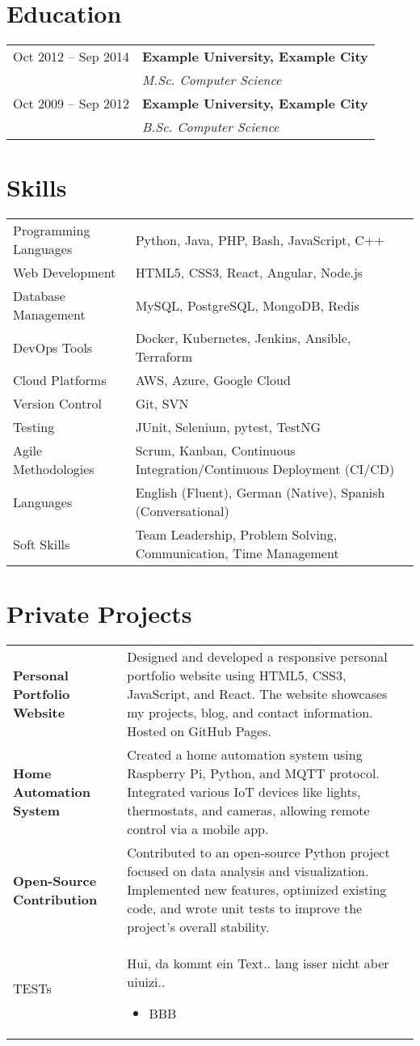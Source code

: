 \documentclass{scrartcl}
\newcommand{\leftcolsize}{4cm}
\newcommand{\educationitem}[3]{%
    #1 & \textbf{#2} \\
       & \textit{#3} \\
}
\newcommand{\cvblock}[2]{
    \section*{#1}
    \begin{tabularx}{\textwidth}[ht]{>{\raggedleft}p{\leftcolsize}|X}
    		#2
    \end{tabularx}
    \vspace{0.5em}   
}
\newcommand{\cvblockitem}[2]{
    #1 & #2 \\
}
\newcommand{\privateprojects}[1]{
    \section*{Private Projects}
    \begin{tabularx}{\textwidth}[ht]{>{\raggedleft}p{\leftcolsize}|X}
       #1
    \end{tabularx}
    \vspace{0.5em} %
    \ifthenelse{\isundefined{\github}}{}{\textbf{GitHub:} \github}
}
\newcommand{\projectitem}[2]{
     #1 & #2 \\
}
\begin{document}
\cvblock{Education}{
    \educationitem{Oct 2012 -- Sep 2014}{Example University, Example City}{M.Sc. Computer Science}
    \educationitem{Oct 2009 -- Sep 2012}{Example University, Example City}{B.Sc. Computer Science}
}

\cvblock{Skills}{
    \cvblockitem{Programming Languages}{Python, Java, PHP, Bash, JavaScript, C++}
    \cvblockitem{Web Development}{HTML5, CSS3, React, Angular, Node.js}
    \cvblockitem{Database Management}{MySQL, PostgreSQL, MongoDB, Redis}
    \cvblockitem{DevOps Tools}{Docker, Kubernetes, Jenkins, Ansible, Terraform}
    \cvblockitem{Cloud Platforms}{AWS, Azure, Google Cloud}
    \cvblockitem{Version Control}{Git, SVN}
    \cvblockitem{Testing}{JUnit, Selenium, pytest, TestNG}
    \cvblockitem{Agile Methodologies}{Scrum, Kanban, Continuous Integration/Continuous Deployment (CI/CD)}
    \cvblockitem{Languages}{English (Fluent), German (Native), Spanish (Conversational)}
    \cvblockitem{Soft Skills}{Team Leadership, Problem Solving, Communication, Time Management}
}

\privateprojects{
    \projectitem{\textbf{Personal Portfolio Website}}{Designed and developed a responsive personal portfolio website using HTML5, CSS3, JavaScript, and React. The website showcases my projects, blog, and contact information. Hosted on GitHub Pages.}
    \projectitem{\textbf{Home Automation System}}{Created a home automation system using Raspberry Pi, Python, and MQTT protocol. Integrated various IoT devices like lights, thermostats, and cameras, allowing remote control via a mobile app.}
    \projectitem{\textbf{Open-Source Contribution}}{Contributed to an open-source Python project focused on data analysis and visualization. Implemented new features, optimized existing code, and wrote unit tests to improve the project's overall stability.}
    
    \projectitem{TESTs}{
    Hui, da kommt ein Text.. lang isser nicht aber uiuizi..    
    \begin{itemize}
        \item BBB
    \end{itemize}
    }
}
\end{document}
